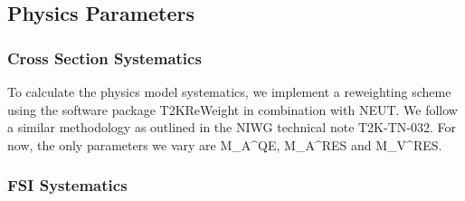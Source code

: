\subsection{Physics Parameters}
\label{sec:Systematics_PhysicsPar}
\subsubsection{Cross Section Systematics}

To calculate the physics model systematics, we implement a reweighting scheme using the software package T2KReWeight in combination with NEUT. We follow a similar methodology as outlined in the NIWG technical note T2K-TN-032. For now, the only parameters we vary are M_A^{QE}, M_A^{RES} and M_V^{RES}.
\subsubsection{FSI Systematics}
